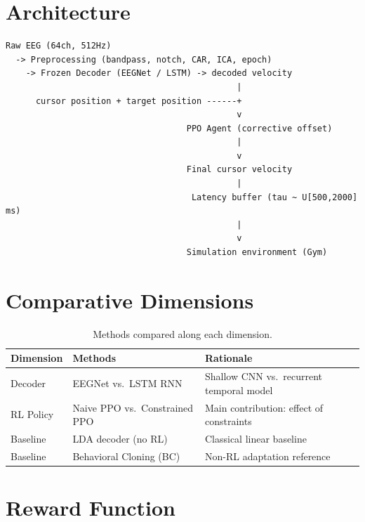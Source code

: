 \documentclass[11pt]{article}
\begin{document}
\section{Architecture}

\begin{verbatim}
Raw EEG (64ch, 512Hz)
  -> Preprocessing (bandpass, notch, CAR, ICA, epoch)
    -> Frozen Decoder (EEGNet / LSTM) -> decoded velocity
                                              |
      cursor position + target position ------+
                                              v
                                    PPO Agent (corrective offset)
                                              |
                                              v
                                    Final cursor velocity
                                              |
                                     Latency buffer (tau ~ U[500,2000] ms)
                                              |
                                              v
                                    Simulation environment (Gym)
\end{verbatim}

\section{Comparative Dimensions}

\begin{table}[h]
\centering
\caption{Methods compared along each dimension.}
\begin{tabular}{@{}lll@{}}
\toprule
\textbf{Dimension} & \textbf{Methods} & \textbf{Rationale} \\
\midrule
Decoder        & EEGNet vs.\ LSTM RNN       & Shallow CNN vs.\ recurrent temporal model \\
RL Policy      & Naive PPO vs.\ Constrained PPO & Main contribution: effect of constraints \\
Baseline       & LDA decoder (no RL)        & Classical linear baseline \\
Baseline       & Behavioral Cloning (BC)    & Non-RL adaptation reference \\
\bottomrule
\end{tabular}
\end{table}

\section{Reward Function}
\end{document}
